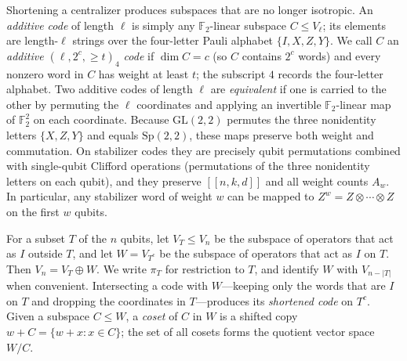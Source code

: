 \documentclass[11pt]{article}
\theoremstyle{definition}
\theoremstyle{remark}
\newcommand{\F}{\mathbb F_2}
\newcommand{\qc}[1]{[\![#1]\!]}
\begin{document}
Shortening a centralizer produces subspaces that are no longer
isotropic. An \emph{additive code} of length \(\ell\) is simply any
\(\F\)-linear subspace \(C\leq V_\ell\); its elements are length-\(\ell\)
strings over the four-letter Pauli alphabet \(\{I,X,Z,Y\}\). We call
\(C\) an \emph{additive \((\ell,2^c,{\geq}t)_4\) code} if
\(\dim C=c\) (so \(C\) contains \(2^c\) words) and every nonzero word in
\(C\) has weight at least \(t\); the subscript \(4\) records the
four-letter alphabet. Two additive codes of length \(\ell\) are
\emph{equivalent} if one is carried to the other by permuting the
\(\ell\) coordinates and applying an invertible \(\F\)-linear map of
\(\F^2\) on each coordinate. Because \(\mathrm{GL}(2,2)\) permutes the
three nonidentity letters \(\{X,Z,Y\}\) and equals \(\mathrm{Sp}(2,2)\),
these maps preserve both weight and commutation. On stabilizer codes
they are precisely qubit permutations combined with single-qubit
Clifford operations (permutations of the three nonidentity letters on
each qubit), and they preserve \(\qc{n,k,d}\) and all weight counts
\(A_w\). In particular, any stabilizer word of weight \(w\) can be
mapped to \(Z^w=Z\otimes\cdots\otimes Z\) on the first \(w\) qubits.

For a subset \(T\) of the \(n\) qubits, let \(V_T\leq V_n\) be the
subspace of operators that act as \(I\) outside \(T\), and let
\(W=V_{T^c}\) be the subspace of operators that act as \(I\) on \(T\).
Then \(V_n=V_T\oplus W\). We write \(\pi_T\) for restriction to \(T\),
and identify \(W\) with \(V_{n-|T|}\) when convenient. Intersecting a
code with \(W\)---keeping only the words that are \(I\) on \(T\) and
dropping the coordinates in \(T\)---produces its \emph{shortened code}
on \(T^c\). Given a subspace \(C\leq W\), a \emph{coset} of \(C\) in
\(W\) is a shifted copy \(w+C=\{w+x:x\in C\}\); the set of all cosets
forms the quotient vector space \(W/C\).
\end{document}
